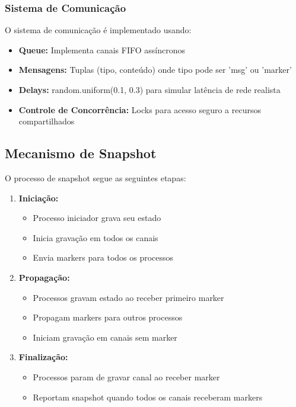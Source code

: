 \documentclass[12pt]{article}
\begin{document}
\subsubsection{Sistema de Comunicação}

O sistema de comunicação é implementado usando:

\begin{itemize}
    \item \textbf{Queue:} Implementa canais FIFO assíncronos
    \item \textbf{Mensagens:} Tuplas (tipo, conteúdo) onde tipo pode ser 'msg' ou 'marker'
    \item \textbf{Delays:} random.uniform(0.1, 0.3) para simular latência de rede realista
    \item \textbf{Controle de Concorrência:} Locks para acesso seguro a recursos compartilhados
\end{itemize}

\subsection{Mecanismo de Snapshot}

O processo de snapshot segue as seguintes etapas:

\begin{enumerate}
    \item \textbf{Iniciação:}
        \begin{itemize}
            \item Processo iniciador grava seu estado
            \item Inicia gravação em todos os canais
            \item Envia markers para todos os processos
        \end{itemize}
    \item \textbf{Propagação:}
        \begin{itemize}
            \item Processos gravam estado ao receber primeiro marker
            \item Propagam markers para outros processos
            \item Iniciam gravação em canais sem marker
        \end{itemize}
    \item \textbf{Finalização:}
        \begin{itemize}
            \item Processos param de gravar canal ao receber marker
            \item Reportam snapshot quando todos os canais receberam markers
        \end{itemize}
\end{enumerate}
\end{document}
